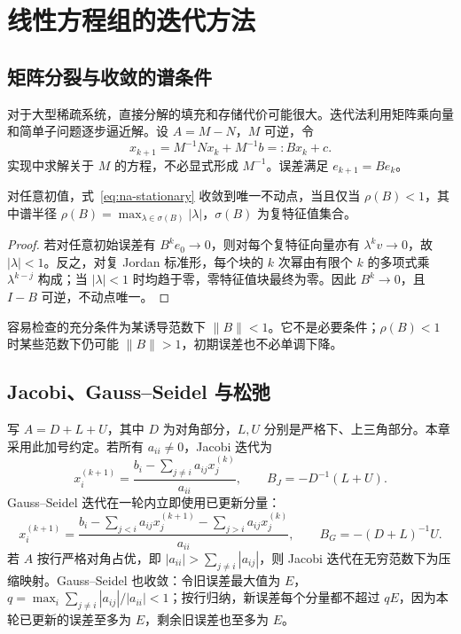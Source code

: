 \setcounter{chapter}{5} %
\chapter{线性方程组的迭代方法}
\label{chap:na-iterative}

\section{矩阵分裂与收敛的谱条件}
对于大型稀疏系统，直接分解的填充和存储代价可能很大。迭代法利用矩阵乘向量和简单子问题逐步逼近解。设 $A=M-N$，$M$ 可逆，令
\begin{equation}
 x_{k+1}=M^{-1}Nx_k+M^{-1}b=:Bx_k+c.
 \label{eq:na-stationary}
\end{equation}
实现中求解关于 $M$ 的方程，不必显式形成 $M^{-1}$。误差满足 $e_{k+1}=Be_k$。

\begin{theorem}[定常迭代的充要条件]
对任意初值，式~\eqref{eq:na-stationary} 收敛到唯一不动点，当且仅当 $\rho(B)<1$，其中谱半径 $\rho(B)=\max_{\lambda\in\sigma(B)}|\lambda|$，$\sigma(B)$ 为复特征值集合。
\end{theorem}
\begin{proof}
若对任意初始误差有 $B^ke_0\to0$，则对每个复特征向量亦有 $\lambda^kv\to0$，故 $|\lambda|<1$。反之，对复 Jordan 标准形，每个块的 $k$ 次幂由有限个 $k$ 的多项式乘 $\lambda^{k-j}$ 构成；当 $|\lambda|<1$ 时均趋于零，零特征值块最终为零。因此 $B^k\to0$，且 $I-B$ 可逆，不动点唯一。
\end{proof}

容易检查的充分条件为某诱导范数下 $\|B\|<1$。它不是必要条件；$\rho(B)<1$ 时某些范数下仍可能 $\|B\|>1$，初期误差也不必单调下降。

\section{Jacobi、Gauss--Seidel 与松弛}
写 $A=D+L+U$，其中 $D$ 为对角部分，$L,U$ 分别是严格下、上三角部分。本章采用此加号约定。若所有 $a_{ii}\ne0$，Jacobi 迭代为
\[
 x_i^{(k+1)}=\frac{b_i-\sum_{j\ne i}a_{ij}x_j^{(k)}}{a_{ii}},
 \qquad B_J=-D^{-1}(L+U).
\]
Gauss--Seidel 迭代在一轮内立即使用已更新分量：
\[
 x_i^{(k+1)}=\frac{b_i-\sum_{j<i}a_{ij}x_j^{(k+1)}-\sum_{j>i}a_{ij}x_j^{(k)}}{a_{ii}},
 \qquad B_G=-(D+L)^{-1}U.
\]
若 $A$ 按行严格对角占优，即 $|a_{ii}|>\sum_{j\ne i}|a_{ij}|$，则 Jacobi 迭代在无穷范数下为压缩映射。Gauss--Seidel 也收敛：令旧误差最大值为 $E$，$q=\max_i\sum_{j\ne i}|a_{ij}|/|a_{ii}|<1$；按行归纳，新误差每个分量都不超过 $qE$，因为本轮已更新的误差至多为 $E$，剩余旧误差也至多为 $E$。

